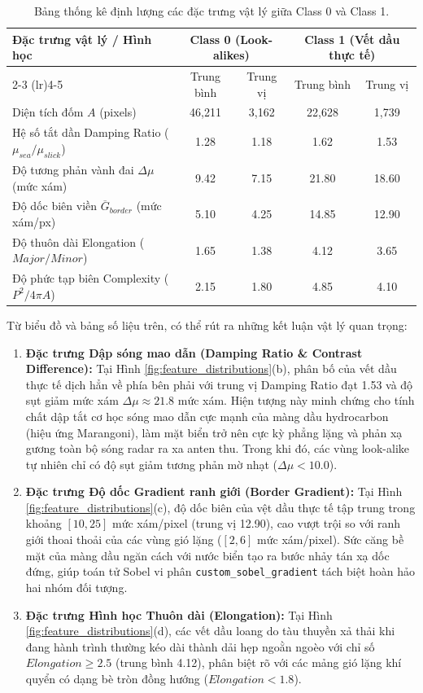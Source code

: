 \begin{table}[H]
\centering
\caption{Bảng thống kê định lượng các đặc trưng vật lý giữa Class 0 và Class 1.}
\label{tab:feature_stats}
\begin{tabular}{lcccc}
\toprule
\textbf{Đặc trưng vật lý / Hình học} & \multicolumn{2}{c}{\textbf{Class 0 (Look-alikes)}} & \multicolumn{2}{c}{\textbf{Class 1 (Vết dầu thực tế)}} \\
\cmidrule(lr){2-3} \cmidrule(lr){4-5}
& Trung bình & Trung vị & Trung bình & Trung vị \\
\midrule
Diện tích đốm $A$ (pixels) & 46,211 & 3,162 & 22,628 & 1,739 \\
Hệ số tắt dần Damping Ratio ($\mu_{sea} / \mu_{slick}$) & 1.28 & 1.18 & 1.62 & 1.53 \\
Độ tương phản vành đai $\Delta \mu$ (mức xám) & 9.42 & 7.15 & 21.80 & 18.60 \\
Độ dốc biên viền $\overline{G}_{border}$ (mức xám/px) & 5.10 & 4.25 & 14.85 & 12.90 \\
Độ thuôn dài Elongation ($Major / Minor$) & 1.65 & 1.38 & 4.12 & 3.65 \\
Độ phức tạp biên Complexity ($P^2 / 4\pi A$) & 2.15 & 1.80 & 4.85 & 4.10 \\
\bottomrule
\end{tabular}
\end{table}

Từ biểu đồ và bảng số liệu trên, có thể rút ra những kết luận vật lý quan trọng:
\begin{enumerate}
    \item \textbf{Đặc trưng Dập sóng mao dẫn (Damping Ratio \& Contrast Difference):}
    Tại Hình \ref{fig:feature_distributions}(b), phân bố của vết dầu thực tế dịch hẳn về phía bên phải với trung vị Damping Ratio đạt 1.53 và độ sụt giảm mức xám $\Delta \mu \approx 21.8$ mức xám. Hiện tượng này minh chứng cho tính chất dập tắt cơ học sóng mao dẫn cực mạnh của màng dầu hydrocarbon (hiệu ứng Marangoni), làm mặt biển trở nên cực kỳ phẳng lặng và phản xạ gương toàn bộ sóng radar ra xa anten thu. Trong khi đó, các vùng look-alike tự nhiên chỉ có độ sụt giảm tương phản mờ nhạt ($\Delta \mu < 10.0$).
    \item \textbf{Đặc trưng Độ dốc Gradient ranh giới (Border Gradient):}
    Tại Hình \ref{fig:feature_distributions}(c), độ dốc biên của vệt dầu thực tế tập trung trong khoảng $[10, 25]$ mức xám/pixel (trung vị 12.90), cao vượt trội so với ranh giới thoai thoải của các vùng gió lặng ($[2, 6]$ mức xám/pixel). Sức căng bề mặt của màng dầu ngăn cách với nước biển tạo ra bước nhảy tán xạ dốc đứng, giúp toán tử Sobel vi phân \texttt{custom\_sobel\_gradient} tách biệt hoàn hảo hai nhóm đối tượng.
    \item \textbf{Đặc trưng Hình học Thuôn dài (Elongation):}
    Tại Hình \ref{fig:feature_distributions}(d), các vết dầu loang do tàu thuyền xả thải khi đang hành trình thường kéo dài thành dải hẹp ngoằn ngoèo với chỉ số $Elongation \ge 2.5$ (trung bình 4.12), phân biệt rõ với các mảng gió lặng khí quyển có dạng bè tròn đồng hướng ($Elongation < 1.8$).
\end{enumerate}

